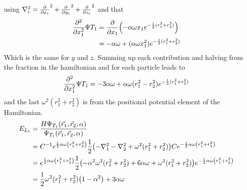 \documentclass[10pt]{revtex4-1}
\begin{document}
using $\nabla_i^2 = \pdv{x_i}^2 + \pdv{y_i}^2 + \pdv{z_i}^2$ and that
\begin{align}
    \pdv[2]{x_1} \Psi{T_1} &= \pdv{x_1}\qty( -\alpha \omega x_1 e^{-\frac{1}{2}(r_1^2 + r_2^2)} )\nonumber\\
                                &= -\alpha\omega + (\alpha\omega x_1^2)e^{-\frac{1}{2}(r_1^2 + r_2^2)}
\end{align}
Which is the same for $y$ and $z$. Summing up each contribution and halving from the fraction in the hamiltonian and for each particle leads to
\begin{align}
    \pdv[2]{x_1} \Psi{T_1} = -3\alpha\omega + \alpha\omega (r_1^2 - r_2^2)e^{-\frac{1}{2}(r_1^2 + r_2^2)}
\end{align}
and the last $\omega^2 ( r_1^2 + r_2^2 )$ is from the positional potential element of the Hamiltonian.
\begin{align}
    E_{L_1} &= \frac{H \Psi_{T_1} \qty(\vec{r}_1, \vec{r}_2, \alpha )}{\Psi_{T_1} \qty(\vec{r}_1, \vec{r}_2, \alpha )}\nonumber \\
        &= C^{-1} e^{\frac{1}{2}\alpha \omega \qty(r_{1}^{2} + r_{2}^{2})} \frac{1}{2}\qty(-\nabla_1^2 -\nabla_2^2 + \omega^2(r_1^2 + r_2^2))
          C e^{-\frac{1}{2} \alpha \omega \qty(r_1^2 + r_2^2)} \nonumber \\
        &= e^{\frac{1}{2}\alpha \omega \qty(r_{1}^{2} + r_{2}^{2})}
            \frac{1}{2}\qty(-\alpha^2 \omega^2 (r_1^2 + r_2^2) + 6\alpha \omega + \omega^2 (r_1^2 + r_2^2))
            e^{-\frac{1}{2} \alpha \omega \qty(r_1^2 + r_2^2)} \nonumber \\
        &= \frac{1}{2}\omega^2 (r_1^2 + r_2^2)\qty(1 -\alpha^2 ) + 3\alpha \omega \label{eq:naiveLocalEnergyExpanded}
\end{align}
\end{document}
